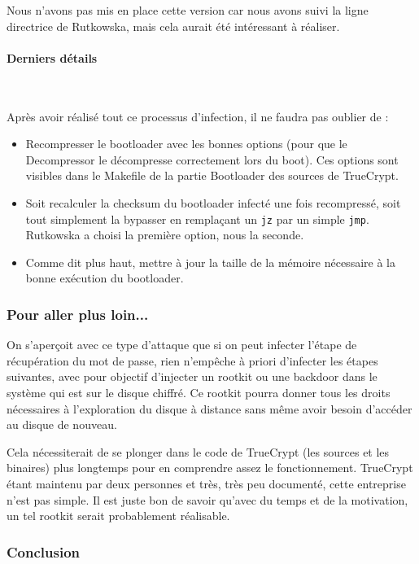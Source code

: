 \documentclass[12pt,a4paper]{article}
\begin{document}
Nous n'avons pas mis en place cette version car nous avons suivi la ligne
directrice de Rutkowska, mais cela aurait été intéressant à réaliser.


\paragraph{Derniers détails} ~

Après avoir réalisé tout ce processus d'infection, il ne faudra pas oublier de :
\begin{itemize}
    \item Recompresser le bootloader avec les bonnes options (pour que le
    Decompressor le décompresse correctement lors du boot). Ces options sont
    visibles dans le Makefile de la partie Bootloader des sources de TrueCrypt.
    \item Soit recalculer la checksum du bootloader infecté une fois recompressé,
    soit tout simplement la bypasser en remplaçant un \texttt{jz} par un simple
    \texttt{jmp}. Rutkowska a choisi la première option, nous la seconde.
    \item Comme dit plus haut, mettre à jour la taille de la mémoire nécessaire
    à la bonne exécution du bootloader.
\end{itemize}

\subsubsection{Pour aller plus loin...}

On s'aperçoit avec ce type d'attaque que si on peut infecter l'étape de
récupération du mot de passe, rien n'empêche à priori d'infecter les étapes 
suivantes, avec pour objectif d'injecter un rootkit ou une backdoor dans le
système qui est sur le disque chiffré. Ce rootkit pourra donner tous les droits
nécessaires à l'exploration du disque à distance sans même avoir besoin
d'accéder au disque de nouveau.

Cela nécessiterait de se plonger dans le code de TrueCrypt (les sources et les
binaires) plus longtemps pour en comprendre assez le fonctionnement. TrueCrypt
étant maintenu par deux personnes et très, très peu documenté, cette entreprise
n'est pas simple. Il est juste bon de savoir qu'avec du temps et de la motivation,
un tel rootkit serait probablement réalisable.

\subsubsection{Conclusion}
\end{document}
